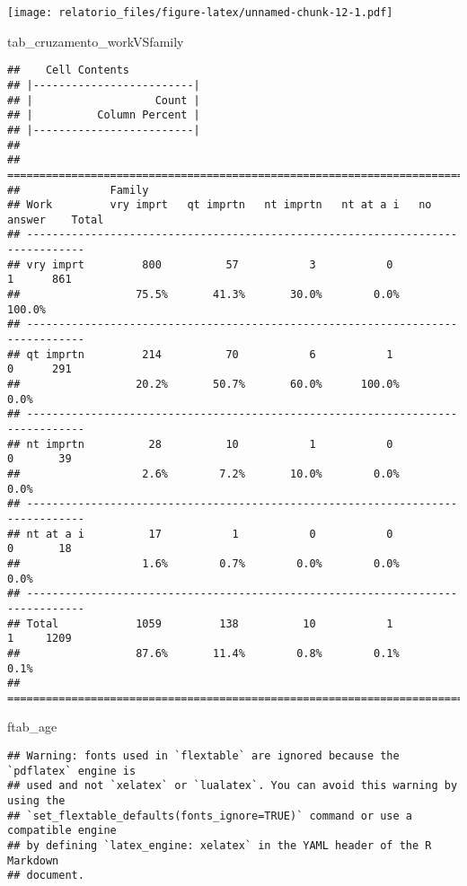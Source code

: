 \documentclass[
]{article}
\newenvironment{Shaded}{\begin{snugshade}}{\end{snugshade}}
\newcommand{\NormalTok}[1]{#1}
\begin{document}
\texttt{[image: relatorio\_files/figure-latex/unnamed-chunk-12-1.pdf]}

\begin{Shaded}
\begin{Highlighting}[]
\NormalTok{tab\_cruzamento\_workVSfamily}
\end{Highlighting}
\end{Shaded}

\begin{verbatim}
##    Cell Contents 
## |-------------------------|
## |                   Count | 
## |          Column Percent | 
## |-------------------------|
## 
## ===============================================================================
##              Family
## Work         vry imprt   qt imprtn   nt imprtn   nt at a i   no answer    Total
## -------------------------------------------------------------------------------
## vry imprt         800          57           3           0           1      861 
##                  75.5%       41.3%       30.0%        0.0%      100.0%         
## -------------------------------------------------------------------------------
## qt imprtn         214          70           6           1           0      291 
##                  20.2%       50.7%       60.0%      100.0%        0.0%         
## -------------------------------------------------------------------------------
## nt imprtn          28          10           1           0           0       39 
##                   2.6%        7.2%       10.0%        0.0%        0.0%         
## -------------------------------------------------------------------------------
## nt at a i          17           1           0           0           0       18 
##                   1.6%        0.7%        0.0%        0.0%        0.0%         
## -------------------------------------------------------------------------------
## Total            1059         138          10           1           1     1209 
##                  87.6%       11.4%        0.8%        0.1%        0.1%         
## ===============================================================================
\end{verbatim}

\begin{Shaded}
\begin{Highlighting}[]
\NormalTok{ftab\_age}
\end{Highlighting}
\end{Shaded}

\begin{verbatim}
## Warning: fonts used in `flextable` are ignored because the `pdflatex` engine is
## used and not `xelatex` or `lualatex`. You can avoid this warning by using the
## `set_flextable_defaults(fonts_ignore=TRUE)` command or use a compatible engine
## by defining `latex_engine: xelatex` in the YAML header of the R Markdown
## document.
\end{verbatim}
\end{document}
